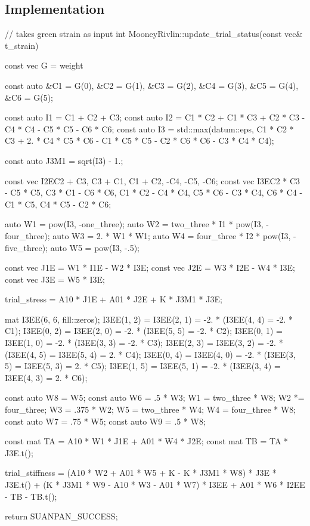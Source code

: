 \subsection{Implementation}
\begin{cppcode}
// takes green strain as input
int MooneyRivlin::update_trial_status(const vec& t_strain) {
    const vec G = weight %

    const auto &C1 = G(0), &C2 = G(1), &C3 = G(2), &C4 = G(3), &C5 = G(4), &C6 = G(5);

    const auto I1 = C1 + C2 + C3;
    const auto I2 = C1 * C2 + C1 * C3 + C2 * C3 - C4 * C4 - C5 * C5 - C6 * C6;
    const auto I3 = std::max(datum::eps, C1 * C2 * C3 + 2. * C4 * C5 * C6 - C1 * C5 * C5 - C2 * C6 * C6 - C3 * C4 * C4);

    const auto J3M1 = sqrt(I3) - 1.;

    const vec I2E{C2 + C3, C3 + C1, C1 + C2, -C4, -C5, -C6};
    const vec I3E{C2 * C3 - C5 * C5, C3 * C1 - C6 * C6, C1 * C2 - C4 * C4, C5 * C6 - C3 * C4, C6 * C4 - C1 * C5, C4 * C5 - C2 * C6};

    auto W1 = pow(I3, -one_three);
    auto W2 = two_three * I1 * pow(I3, -four_three);
    auto W3 = 2. * W1 * W1;
    auto W4 = four_three * I2 * pow(I3, -five_three);
    auto W5 = pow(I3, -.5);

    const vec J1E = W1 * I1E - W2 * I3E;
    const vec J2E = W3 * I2E - W4 * I3E;
    const vec J3E = W5 * I3E;

    trial_stress = A10 * J1E + A01 * J2E + K * J3M1 * J3E;

    mat I3EE(6, 6, fill::zeros);
    I3EE(1, 2) = I3EE(2, 1) = -2. * (I3EE(4, 4) = -2. * C1);
    I3EE(0, 2) = I3EE(2, 0) = -2. * (I3EE(5, 5) = -2. * C2);
    I3EE(0, 1) = I3EE(1, 0) = -2. * (I3EE(3, 3) = -2. * C3);
    I3EE(2, 3) = I3EE(3, 2) = -2. * (I3EE(4, 5) = I3EE(5, 4) = 2. * C4);
    I3EE(0, 4) = I3EE(4, 0) = -2. * (I3EE(3, 5) = I3EE(5, 3) = 2. * C5);
    I3EE(1, 5) = I3EE(5, 1) = -2. * (I3EE(3, 4) = I3EE(4, 3) = 2. * C6);

    const auto W8 = W5;
    const auto W6 = .5 * W3;
    W1 = two_three * W8;
    W2 *= four_three;
    W3 = .375 * W2;
    W5 = two_three * W4;
    W4 = four_three * W8;
    const auto W7 = .75 * W5;
    const auto W9 = .5 * W8;

    const mat TA = A10 * W1 * J1E + A01 * W4 * J2E;
    const mat TB = TA * J3E.t();

    trial_stiffness = (A10 * W2 + A01 * W5 + K - K * J3M1 * W8) * J3E * J3E.t() + (K * J3M1 * W9 - A10 * W3 - A01 * W7) * I3EE + A01 * W6 * I2EE - TB - TB.t();

    return SUANPAN_SUCCESS;
}
\end{cppcode}
